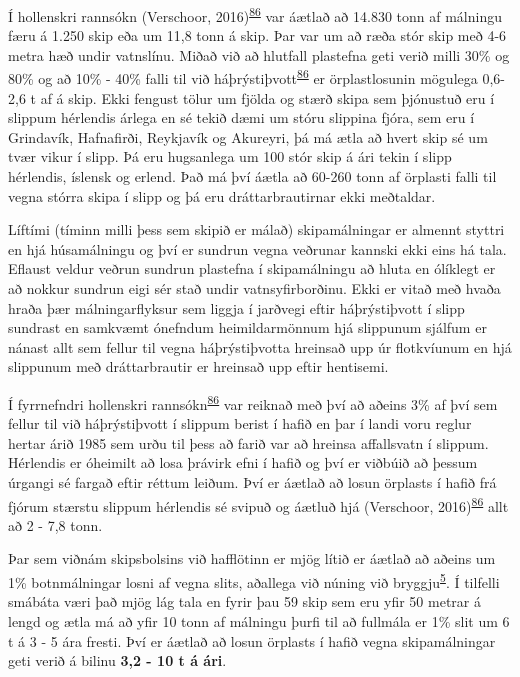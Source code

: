 \documentclass[icelandic,]{book}
\begin{document}
Í hollenskri rannsókn (Verschoor, 2016)\textsuperscript{\protect\hyperlink{ref-Verschoor2016}{86}} var áætlað að 14.830 tonn af málningu færu á 1.250 skip eða um 11,8 tonn á skip. Þar var um að ræða stór skip með 4-6 metra hæð undir vatnslínu. Miðað við að hlutfall plastefna geti verið milli 30\% og 80\% og að 10\% - 40\% falli til við háþrýstiþvott\textsuperscript{\protect\hyperlink{ref-Verschoor2016}{86}} er örplastlosunin mögulega 0,6-2,6 t af á skip. Ekki fengust tölur um fjölda og stærð skipa sem þjónustuð eru í slippum hérlendis árlega en sé tekið dæmi um stóru slippina fjóra, sem eru í Grindavík, Hafnafirði, Reykjavík og Akureyri, þá má ætla að hvert skip sé um tvær vikur í slipp. Þá eru hugsanlega um 100 stór skip á ári tekin í slipp hérlendis, íslensk og erlend. Það má því áætla að 60-260 tonn af örplasti falli til vegna stórra skipa í slipp og þá eru dráttarbrautirnar ekki meðtaldar.

Líftími (tíminn milli þess sem skipið er málað) skipamálningar er almennt styttri en hjá húsamálningu og því er sundrun vegna veðrunar kannski ekki eins há tala. Eflaust veldur veðrun sundrun plastefna í skipamálningu að hluta en ólíklegt er að nokkur sundrun eigi sér stað undir vatnsyfirborðinu. Ekki er vitað með hvaða hraða þær málningarflyksur sem liggja í jarðvegi eftir háþrýstiþvott í slipp sundrast en samkvæmt ónefndum heimildarmönnum hjá slippunum sjálfum er nánast allt sem fellur til vegna háþrýstiþvotta hreinsað upp úr flotkvíunum en hjá slippunum með dráttarbrautir er hreinsað upp eftir hentisemi.

Í fyrrnefndri hollenskri rannsókn\textsuperscript{\protect\hyperlink{ref-Verschoor2016}{86}} var reiknað með því að aðeins 3\% af því sem fellur til við háþrýstiþvott í slippum berist í hafið en þar í landi voru reglur hertar árið 1985 sem urðu til þess að farið var að hreinsa affallsvatn í slippum. Hérlendis er óheimilt að losa þrávirk efni í hafið og því er viðbúið að þessum úrgangi sé fargað eftir réttum leiðum. Því er áætlað að losun örplasts í hafið frá fjórum stærstu slippum hérlendis sé svipuð og áætluð hjá (Verschoor, 2016)\textsuperscript{\protect\hyperlink{ref-Verschoor2016}{86}} allt að 2 - 7,8 tonn.

Þar sem viðnám skipsbolsins við hafflötinn er mjög lítið er áætlað að aðeins um 1\% botnmálningar losni af vegna slits, aðallega við núning við bryggju\textsuperscript{\protect\hyperlink{ref-OECD2009}{5}}. Í tilfelli smábáta væri það mjög lág tala en fyrir þau 59 skip sem eru yfir 50 metrar á lengd og ætla má að yfir 10 tonn af málningu þurfi til að fullmála er 1\% slit um 6 t á 3 - 5 ára fresti. Því er áætlað að losun örplasts í hafið vegna skipamálningar geti verið á bilinu \textbf{3,2 - 10 t á ári}.
\end{document}
